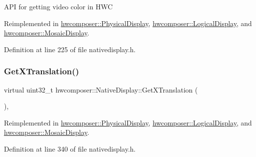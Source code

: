 A\+PI for getting video color in H\+WC 

Reimplemented in \mbox{\hyperlink{classhwcomposer_1_1PhysicalDisplay_a827605530b26ace9d48203c645d11b71}{hwcomposer\+::\+Physical\+Display}}, \mbox{\hyperlink{classhwcomposer_1_1LogicalDisplay_a026e99a7fbdb31e02bba1c968c3e2842}{hwcomposer\+::\+Logical\+Display}}, and \mbox{\hyperlink{classhwcomposer_1_1MosaicDisplay_ab4b88eb3a5d9a811dada73b0f8d33c4d}{hwcomposer\+::\+Mosaic\+Display}}.



Definition at line 225 of file nativedisplay.\+h.


\begin{DoxyCode}{0}
\end{DoxyCode}
\mbox{\label{classhwcomposer_1_1NativeDisplay_a1f934e9ab6149fb35bd2868605c215dd}} 
\subsubsection{\texorpdfstring{Get\+X\+Translation()}{GetXTranslation()}}
{\footnotesize\ttfamily virtual uint32\+\_\+t hwcomposer\+::\+Native\+Display\+::\+Get\+X\+Translation (\begin{DoxyParamCaption}{ }\end{DoxyParamCaption})\hspace{0.3cm}{\ttfamily [inline]}, {\ttfamily [virtual]}}



Reimplemented in \mbox{\hyperlink{classhwcomposer_1_1PhysicalDisplay_a6ed8f896bdb7adc6a20bf25c3fe41f8f}{hwcomposer\+::\+Physical\+Display}}, \mbox{\hyperlink{classhwcomposer_1_1LogicalDisplay_a1eea402be34da5de3ce4d3c9927768ae}{hwcomposer\+::\+Logical\+Display}}, and \mbox{\hyperlink{classhwcomposer_1_1MosaicDisplay_a8f006e53e5d0e8c6caf8ac50f25ab407}{hwcomposer\+::\+Mosaic\+Display}}.



Definition at line 340 of file nativedisplay.\+h.


\begin{DoxyCode}{0}
\end{DoxyCode}
\mbox{\label{classhwcomposer_1_1NativeDisplay_a761f39e34a12a88b4f8a4c1ef49e2b10}} 
